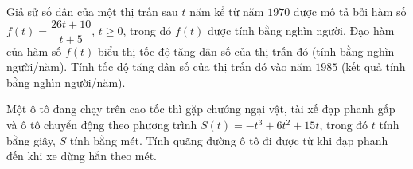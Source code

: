 \begin{bt}%
	Giả sử số dân của một thị trấn sau $t$ năm kể từ năm $1970$ được mô tả bởi hàm số $f(t)=\dfrac{26 t+10}{t+5}$, $t \geq 0$, trong đó $f(t)$ được tính bằng nghìn người. Đạo hàm của hàm số $f(t)$ biểu thị tốc độ tăng dân số của thị trấn đó (tính bằng nghìn người/năm). Tính tốc độ tăng dân số của thị trấn đó vào năm $1985$ (kết quả tính bằng nghìn người/năm).
\end{bt}

\begin{bt}%

	Một ô tô đang chạy trên cao tốc thì gặp chướng ngại vật, tài xế đạp phanh gấp và ô tô chuyển động theo phương trình $S(t) =  - t^3 + 6t^2 + 15t$, trong đó $t$ tính bằng giây, $S$ tính bằng mét. Tính quãng đường ô tô đi được từ khi đạp phanh đến khi xe dừng hẳn theo mét. 
\end{bt}

